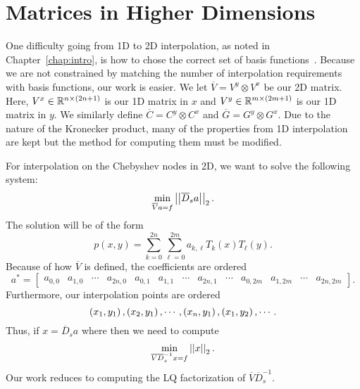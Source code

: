 \section{\CV{} Matrices in Higher Dimensions}
\label{sec:CV_higher}

One difficulty going from 1D to 2D interpolation, as noted in
Chapter~\ref{chap:intro}, is how
to chose the correct set of basis functions~\cite{gasca2000polynomial}.
Because we are not constrained by matching the number
of interpolation requirements with basis functions, our work is easier.
We let $\overline{V} = V^{y} \otimes V^{x}$ be our 2D \CV{}
matrix. Here, $V^{x}\in\mathbb{R}^{n\times(2n+1)}$
is our 1D \CV{} matrix in $x$
and $V^{y}\in\mathbb{R}^{m\times(2m+1)}$ is our 1D \CV{} matrix in $y$.
We similarly define $\overline{C} = C^{y}\otimes C^{x}$ and
$\overline{G} = G^{y}\otimes G^{x}$.
Due to the nature of the Kronecker product, many of the properties
from 1D interpolation are kept but the method for computing them
must be modified.

For interpolation on the Chebyshev nodes in 2D, we want to solve
the following system:
%
\begin{equation}
    \min_{\overline{V}a=f}\left| \left| \overline{D}_{s}a \right| \right|_{2}.
\end{equation}
%
The solution will be of the form
%
\begin{equation}
    p(x,y) = \sum_{k=0}^{2n}\sum_{\ell=0}^{2m} a_{k,\ell}T_{k}(x)T_{\ell}(y).
\end{equation}
%
Because of how $\overline{V}$ is defined, the coefficients are ordered
%
\begin{equation}
    a^{*} = \begin{bmatrix} a_{0,0} & a_{1,0} & \cdots &
                        a_{2n,0} & a_{0,1} & a_{1,1} & \cdots &
                        a_{2n,1} & \cdots &
                        a_{0,2m} & a_{1,2m} & \cdots & a_{2n,2m}
        \end{bmatrix}.
\end{equation}
%
Furthermore, our interpolation points are ordered
%
\begin{equation}
    \left( x_{1},y_{1} \right),\left( x_{2},y_{1} \right),\cdots,\left( x_{n},y_{1} \right),
    \left( x_{1},y_{2} \right),\cdots.
\end{equation}
%
Thus, if $x = \overline{D}_{s}a$ where
then we need to compute
%
\begin{equation}
    \min_{\overline{V}\overline{D}_{s}^{-1}x = f}\left| \left| x \right| \right|_{2}.
\end{equation}
%
Our work reduces to computing the LQ factorization of
$\overline{V}\overline{D}_{s}^{-1}$.

